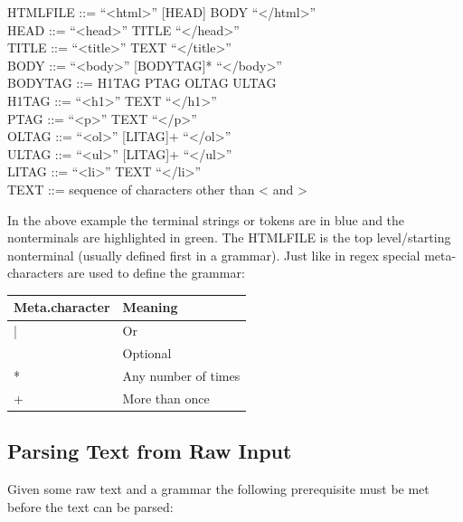 \documentclass[
]{book}
\begin{document}
{HTMLFILE} ::= ``{\textless html\textgreater{}}'' {[}{HEAD}{]} {BODY} ``{\textless/html\textgreater{}}''\\
{HEAD} ::= ``{\textless head\textgreater{}}'' {TITLE} ``{\textless/head\textgreater{}}''\\
{TITLE} ::= ``{\textless title\textgreater{}}'' {TEXT} ``{\textless/title\textgreater{}}''\\
{BODY} ::= ``{\textless body\textgreater{}}'' {[}{BODYTAG}{]}* ``{\textless/body\textgreater{}}''\\
{BODYTAG} ::= {H1TAG} \textbar{} {PTAG} \textbar{} {OLTAG} \textbar{} {ULTAG}\\
{H1TAG} ::= ``{\textless h1\textgreater{}}'' {TEXT} ``{\textless/h1\textgreater{}}''\\
{PTAG} ::= ``\textless p\textgreater{}'' {TEXT} ``{\textless/p\textgreater{}}''\\
{OLTAG} ::= ``{\textless ol\textgreater{}}'' {[}{LITAG}{]}+ ``{\textless/ol\textgreater{}}''\\
{ULTAG} ::= ``{\textless ul\textgreater{}}'' {[}{LITAG}{]}+ ``{\textless/ul\textgreater{}}''\\
{LITAG} ::= ``{\textless li\textgreater{}}'' {TEXT} ``{\textless/li\textgreater{}}''\\
{TEXT} ::= sequence of characters other than \textless{} and \textgreater{}

In the above example the terminal strings or tokens are in {blue} and the {nonterminals} are highlighted in {green}. The {HTMLFILE} is the top level/starting nonterminal (usually defined first in a grammar). Just like in regex special meta-characters are used to define the grammar:

\begin{tabular}{ll}
\toprule
Meta.character & Meaning\\
\midrule
| & Or\\
[NT\textbackslash{}] & Optional\\
[NT]* & Any number of times\\
[NT]+ & More than once\\
\bottomrule
\end{tabular}

\hypertarget{parsing-text-from-raw-input}{%
\subsection{Parsing Text from Raw Input}\label{parsing-text-from-raw-input}}

Given some raw text and a grammar the following prerequisite must be met before the text can be parsed:
\end{document}
